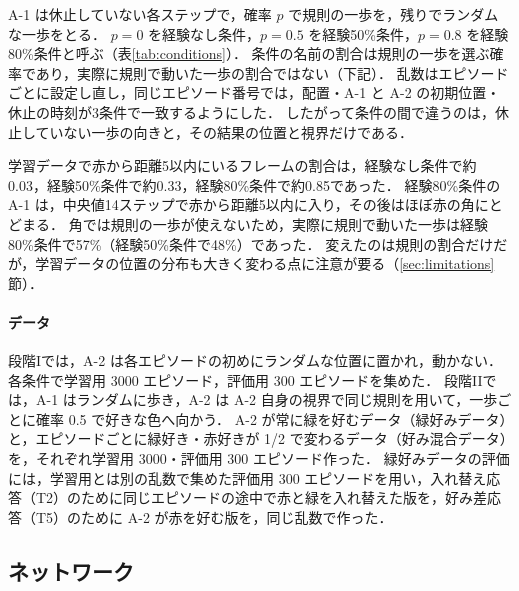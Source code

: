 A-1 は休止していない各ステップで，確率 $p$ で規則の一歩を，残りでランダムな一歩をとる．
$p=0$ を経験なし条件，$p=0.5$ を経験50\%条件，$p=0.8$ を経験80\%条件と呼ぶ（表\ref{tab:conditions}）．
条件の名前の割合は規則の一歩を選ぶ確率であり，実際に規則で動いた一歩の割合ではない（下記）．
乱数はエピソードごとに設定し直し，同じエピソード番号では，配置・A-1 と A-2 の初期位置・休止の時刻が3条件で一致するようにした．
したがって条件の間で違うのは，休止していない一歩の向きと，その結果の位置と視界だけである．

学習データで赤から距離5以内にいるフレームの割合は，経験なし条件で約0.03，経験50\%条件で約0.33，経験80\%条件で約0.85であった．
経験80\%条件の A-1 は，中央値14ステップで赤から距離5以内に入り，その後はほぼ赤の角にとどまる．
角では規則の一歩が使えないため，実際に規則で動いた一歩は経験80\%条件で57\%（経験50\%条件で48\%）であった．
変えたのは規則の割合だけだが，学習データの位置の分布も大きく変わる点に注意が要る（\ref{sec:limitations}節）．

\paragraph{データ}
段階Iでは，A-2 は各エピソードの初めにランダムな位置に置かれ，動かない．
各条件で学習用 3000 エピソード，評価用 300 エピソードを集めた．
段階IIでは，A-1 はランダムに歩き，A-2 は A-2 自身の視界で同じ規則を用いて，一歩ごとに確率 0.5 で好きな色へ向かう．
A-2 が常に緑を好むデータ（緑好みデータ）と，エピソードごとに緑好き・赤好きが 1/2 で変わるデータ（好み混合データ）を，それぞれ学習用 3000・評価用 300 エピソード作った．
緑好みデータの評価には，学習用とは別の乱数で集めた評価用 300 エピソードを用い，入れ替え応答（T2）のために同じエピソードの途中で赤と緑を入れ替えた版を，好み差応答（T5）のために A-2 が赤を好む版を，同じ乱数で作った．

\subsection{ネットワーク}\label{sec:network}

